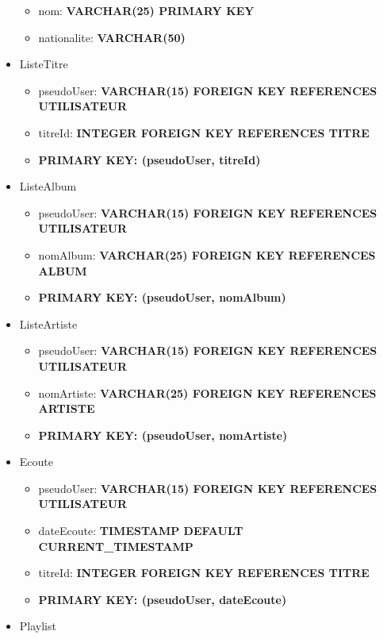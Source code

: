 \documentclass[a4paper,12pt, french]{report}
\begin{document}
\begin{itemize}
        \begin{itemize}
          \item nom: \textbf{VARCHAR(25) PRIMARY KEY}
          \item nationalite: \textbf{VARCHAR(50)}
        \end{itemize}
      \item ListeTitre
        \begin{itemize}
          \item pseudoUser: \textbf{VARCHAR(15) FOREIGN KEY REFERENCES UTILISATEUR}
          \item titreId: \textbf{INTEGER FOREIGN KEY REFERENCES TITRE}
          \item \textbf{PRIMARY KEY: (pseudoUser, titreId)}
        \end{itemize}
      \item ListeAlbum
        \begin{itemize}
          \item pseudoUser: \textbf{VARCHAR(15) FOREIGN KEY REFERENCES UTILISATEUR}
          \item nomAlbum: \textbf{VARCHAR(25) FOREIGN KEY REFERENCES ALBUM}
          \item \textbf{PRIMARY KEY: (pseudoUser, nomAlbum)}
        \end{itemize}
      \item ListeArtiste
        \begin{itemize}
          \item pseudoUser: \textbf{VARCHAR(15) FOREIGN KEY REFERENCES UTILISATEUR}
          \item nomArtiste: \textbf{VARCHAR(25) FOREIGN KEY REFERENCES ARTISTE}
          \item \textbf{PRIMARY KEY: (pseudoUser, nomArtiste)}
        \end{itemize}
      \item Ecoute
        \begin{itemize}
          \item pseudoUser: \textbf{VARCHAR(15) FOREIGN KEY REFERENCES UTILISATEUR}
          \item dateEcoute: \textbf{TIMESTAMP DEFAULT CURRENT\_TIMESTAMP}
          \item titreId: \textbf{INTEGER FOREIGN KEY REFERENCES TITRE}
          \item \textbf{PRIMARY KEY: (pseudoUser, dateEcoute)}
        \end{itemize}
      \item Playlist

\end{itemize}
\end{document}
